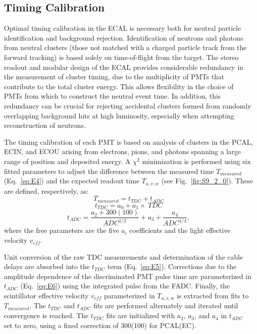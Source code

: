 \subsection{Timing Calibration}

Optimal timing calibration in the ECAL is necessary both for neutral particle identification and background rejection.
Identification of neutrons and photons from neutral clusters (those not matched with a charged particle track from
the forward tracking) is based solely on time-of-flight from the target. The stereo readout and modular design of
the ECAL provides considerable redundancy in the measurement of cluster timing, due to the multiplicity of PMTs
that contribute to the total cluster energy. This allows flexibility in the choice of PMTs from which to construct the
neutral event time. In addition, this redundancy can be crucial for rejecting accidental clusters formed from
randomly overlapping background hits at high luminosity, especially when attempting reconstruction of neutrons. 

The timing calibration of each PMT is based on analysis of clusters in the PCAL, ECIN, and ECOU arising from
electrons, pions, and photons spanning a large range of position and deposited energy. A $\chi^2$ minimization is
performed using six fitted parameters to adjust the difference between the measured time $T_{measured}$
(Eq.~\ref{eq:E4}) and the expected readout time $T_{u,v,w}$ (see Fig.~\ref{fig:S9_2_0}). These are defined,
respectively, as:
\begin{equation}
  T_{measured}=t_{TDC}+t_{ADC}
  \label{eq:E4}
\end{equation}
\begin{equation}
  t_{TDC}=a_0+a_1\times~TDC
  \label{eq:E5}
\end{equation}
\begin{equation}
  t_{ADC}=\frac{a_2+300(100)}{ADC^{1/2}}+a_3+\frac{a_4}{ADC^{1/4}},
  \label{eq:E6}
\end{equation}
where the free parameters are the five $a_i$ coefficients and the light effective velocity $v_{eff}$.

Unit conversion of the raw TDC measurements and determination of the cable delays are absorbed into the
$t_{TDC}$ term (Eq.~\ref{eq:E5}). Corrections due to the amplitude dependence of the discriminated PMT pulse
time are parameterized in $t_{ADC}$ (Eq.~\ref{eq:E6}) using the integrated pulse from the FADC. Finally, the
scintillator effective velocity $v_{eff}$ parameterized in $T_{u,v,w}$ is extracted from fits to $T_{measured}$.
The $t_{TDC}$ and $t_{ADC}$ fits are performed alternately and iterated until convergence is reached. The
$t_{TDC}$ fits are initialized with $a_2$, $a_3$, and $a_4$ in $t_{ADC}$ set to zero, using a fixed correction of
300(100) for PCAL(EC).


